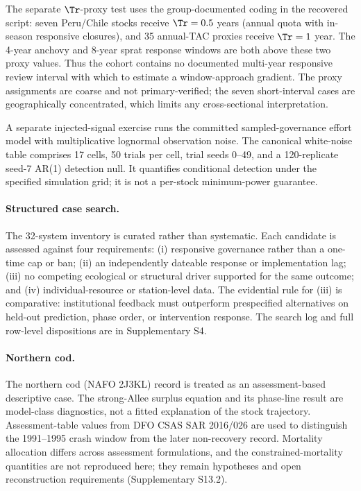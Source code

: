 The separate \(\Tr\)-proxy test uses the group-documented coding in the recovered script: seven Peru/Chile stocks receive \(\Tr=0.5\) years (annual quota with in-season responsive closures), and 35 annual-TAC proxies receive \(\Tr=1\) year. The 4-year anchovy and 8-year sprat response windows are both above these two proxy values. Thus the cohort contains no documented multi-year responsive review interval with which to estimate a window-approach gradient. The proxy assignments are coarse and not primary-verified; the seven short-interval cases are geographically concentrated, which limits any cross-sectional interpretation.

A separate injected-signal exercise runs the committed sampled-governance effort model with multiplicative lognormal observation noise. The canonical white-noise table comprises 17 cells, 50 trials per cell, trial seeds 0--49, and a 120-replicate seed-7 AR(1) detection null. It quantifies conditional detection under the specified simulation grid; it is not a per-stock minimum-power guarantee.

\paragraph{Structured case search.} The 32-system inventory is curated rather than systematic. Each candidate is assessed against four requirements: (i) responsive governance rather than a one-time cap or ban; (ii) an independently dateable response or implementation lag; (iii) no competing ecological or structural driver supported for the same outcome; and (iv) individual-resource or station-level data. The evidential rule for (iii) is comparative: institutional feedback must outperform prespecified alternatives on held-out prediction, phase order, or intervention response. The search log and full row-level dispositions are in Supplementary S4.

\paragraph{Northern cod.} The northern cod (NAFO 2J3KL) record is treated as an assessment-based descriptive case. The strong-Allee surplus equation and its phase-line result are model-class diagnostics, not a fitted explanation of the stock trajectory. Assessment-table values from DFO CSAS SAR 2016/026 are used to distinguish the 1991--1995 crash window from the later non-recovery record. Mortality allocation differs across assessment formulations, and the constrained-mortality quantities are not reproduced here; they remain hypotheses and open reconstruction requirements (Supplementary S13.2).

